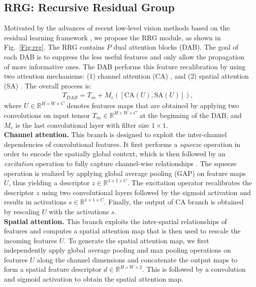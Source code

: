 \documentclass[10pt,twocolumn,letterpaper]{article}
\begin{document}
\subsection{RRG: Recursive Residual Group}
\label{sec:rrg}
Motivated by the advances of recent low-level vision methods \cite{ren2019rain,Zhang2018dehaze,DnCNN,zhang2018rcan} based on the residual learning framework \cite{He2016},
we propose the RRG module, as shown in Fig.~\ref{Fig:rrg}. 
The RRG contains $P$ dual attention blocks (DAB). 
The goal of each DAB is to suppress the less useful features and only allow the propagation of more informative ones. 
The DAB performs this feature recalibration by using two  
attention mechanisms: (1) channel attention (CA) \cite{hu2018squeeze}, and (2) spatial attention (SA) \cite{woo2018cbam}.  
The overall process is:
\begin{align}
T_{DAB} = T_{in} + M_c([\text{CA}(U), \text{SA}(U)]),
\label{Eq:dab}
\end{align}
where $U \in \mathbb{R}^{H\times W \times C}$ denotes features maps that are obtained by applying two convolutions on input tensor $T_{in} \in \mathbb{R}^{H\times W \times C}$ at the beginning of the DAB, and $M_c$ is the last convolutional layer with filter size $1\times1$. 
\vspace{0.4em}\\
\noindent \textbf{Channel attention.} This branch is designed to exploit the inter-channel dependencies of convolutional features.
It first performs a \emph{squeeze} operation in order to encode the spatially global context, which is then followed by an \emph{excitation} operation to fully capture channel-wise relationships  \cite{hu2018squeeze}. 
The squeeze operation is realized by applying global average pooling (GAP) on feature maps $U$, thus yielding a descriptor $z \in \mathbb{R}^{1\times 1 \times C}$. 
The excitation operator recalibrates the descriptor $z$ using two convolutional layers followed by the sigmoid activation and results in activations $s \in \mathbb{R}^{1\times 1 \times C}$. 
Finally, the output of CA branch is obtained by rescaling $U$ with the activations $s$.
\vspace{0.4em}\\
\noindent \textbf{Spatial attention.} This branch exploits the inter-spatial relationships of features and computes a spatial attention map that is then used to rescale the incoming features $U$. 
To generate the spatial attention map, we first independently apply global average pooling and max pooling operations on features $U$ along the channel dimensions and concatenate the output maps to form a spatial feature descriptor $d \in \mathbb{R}^{H\times W \times 2}$. 
This is followed by a convolution and sigmoid activation to obtain the spatial attention map. 
\end{document}
